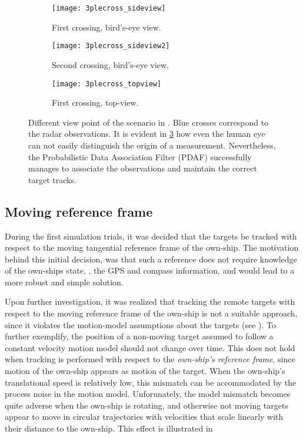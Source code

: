 \begin{figure}[H]
	\begin{subfigure}[b]{.5\textwidth}
		\centering
		\texttt{[image: 3plecross\_sideview]}
		\caption{First crossing, bird's-eye view.}
		\label{fig:multiTrack1view2}
	\end{subfigure}\hfill
	\begin{subfigure}[b]{.5\textwidth}
		\centering
		\texttt{[image: 3plecross\_sideview2]}
		\caption{Second crossing, bird's-eye view.}
		\label{fig:multiTrack2view2}
	\end{subfigure}\hfill
	\begin{subfigure}[b]{1.0\textwidth}
		\centering
		\texttt{[image: 3plecross\_topview]}
		\caption{First crossing, top-view.}
		\label{fig:multiTrack3view2}
	\end{subfigure}\hfill
	\caption{Different view point of the scenario in . Blue crosses correspond to the radar observations. It is evident in \cref{fig:multiTrack3view2} how even the human eye can not easily distinguish the origin of a measurement. Nevertheless, the Probabilistic Data Association Filter (PDAF) successfully manages to associate the observations and maintain the correct target tracks.}
	\label{fig:multiTrackview2}
\end{figure}


\subsection{Moving reference frame}\label{ssec:movingreferenceframe}
During the first simulation trials, it was decided that the targets be tracked with respect to the moving tangential reference frame of the own-ship. The motivation behind this initial decision, was that such a reference does not require knowledge of the own-ships state, \ie, the GPS and compass information, and would lead to a more robust and simple solution. 

Upon further investigation, it was realized that tracking the remote targets with respect to the moving reference frame of the own-ship is not a suitable approach, since it violates the motion-model assumptions about the targets (see ). To further exemplify, the position of a  non-moving target assumed to follow a constant velocity motion model should not change over time. This does not hold when tracking is performed with respect to  the \emph{own-ship's reference frame}, since motion of the own-ship appears as motion of the target. When the own-ship's translational speed is relatively low, this mismatch can be accommodated by the process noise in the motion model. Unforunately, the model mismatch becomes quite adverse when the own-ship is rotating, and otherwise not moving targets appear to move in circular trajectories with velocities that scale linearly with their distance to the own-ship. This effect is illustrated in  

